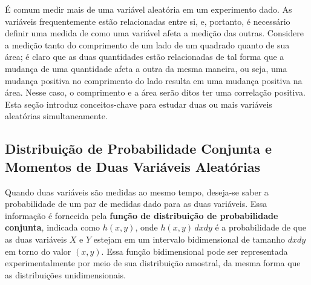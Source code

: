 É comum medir mais de uma variável aleatória em um experimento dado. As variáveis frequentemente estão relacionadas entre si, e, portanto, é necessário definir uma medida de como uma variável afeta a medição das outras. Considere a medição tanto do comprimento de um lado de um quadrado quanto de sua área; é claro que as duas quantidades estão relacionadas de tal forma que a mudança de uma quantidade afeta a outra da mesma maneira, ou seja, uma mudança positiva no comprimento do lado resulta em uma mudança positiva na área. Nesse caso, o comprimento e a área serão ditos ter uma correlação positiva. Esta seção introduz conceitos-chave para estudar duas ou mais variáveis aleatórias simultaneamente.

\subsection{Distribuição de Probabilidade Conjunta e Momentos de Duas Variáveis Aleatórias}

Quando duas variáveis são medidas ao mesmo tempo, deseja-se saber a probabilidade de um par de medidas dado para as duas variáveis. Essa informação é fornecida pela \textbf{função de distribuição de probabilidade conjunta}, indicada como $h(x, y)$, onde $h(x, y)\,dxdy$ é a probabilidade de que as duas variáveis $X$ e $Y$ estejam em um intervalo bidimensional de tamanho $dxdy$ em torno do valor $(x, y)$. Essa função bidimensional pode ser representada experimentalmente por meio de sua distribuição amostral, da mesma forma que as distribuições unidimensionais.

